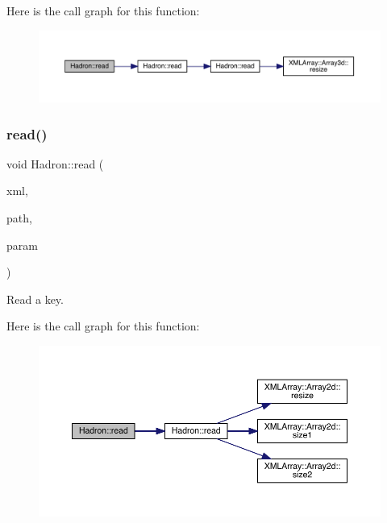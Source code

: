 Here is the call graph for this function\+:
\nopagebreak
\begin{figure}[H]
\begin{center}
\leavevmode
\includegraphics[width=350pt]{d1/daf/namespaceHadron_af8ce56081c184ce7dd924a192bff08a6_cgraph}
\end{center}
\end{figure}
\mbox{\label{namespaceHadron_a3b1642acb606c69519cf7dd88a01fbfd}} 
\subsubsection{\texorpdfstring{read()}{read()}\hspace{0.1cm}{\footnotesize\ttfamily [38/94]}}
{\footnotesize\ttfamily void Hadron\+::read (\begin{DoxyParamCaption}\item[{\mbox{\hyperlink{classADATXML_1_1XMLReader}{X\+M\+L\+Reader}} \&}]{xml,  }\item[{const std\+::string \&}]{path,  }\item[{\mbox{\hyperlink{structHadron_1_1KeyPropElementalOperator__t}{Key\+Prop\+Elemental\+Operator\+\_\+t}} \&}]{param }\end{DoxyParamCaption})}



Read a key. 

Here is the call graph for this function\+:
\nopagebreak
\begin{figure}[H]
\begin{center}
\leavevmode
\includegraphics[width=350pt]{d1/daf/namespaceHadron_a3b1642acb606c69519cf7dd88a01fbfd_cgraph}
\end{center}
\end{figure}
\mbox{\label{namespaceHadron_a9a69bb90cd1c62da66808573864f7cd1}} 
